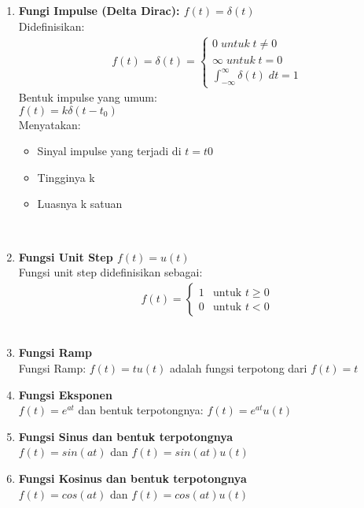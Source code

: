 \documentclass{article}
\begin{document}
\begin{enumerate}
    \item   \textbf{Fungi Impulse (Delta Dirac): $f(t) = \delta(t)$}\\
          Didefinisikan:
          \begin{align}
              f(t) = \delta (t) =
              \begin{cases}
                  0 \;untuk\; t \neq 0
                  \nonumber \\
                  \infty \;untuk\; t = 0
                  \nonumber \\
                  \int_{- \infty}^{\infty} \delta(t)\;dt=1
                  \nonumber
              \end{cases}
          \end{align}
          Bentuk impulse yang umum:\\
          $f(t) = k\delta(t-t_0)$ \\
          Menyatakan:
          \begin{itemize}
              \item Sinyal impulse yang terjadi di $t=t0$
              \item Tingginya k
              \item Luasnya k satuan
          \end{itemize}
          \leavevmode\\
    \item   \textbf{Fungsi Unit Step $f(t) = u(t)$}\\
          Fungsi unit step didefinisikan sebagai:
          \begin{align}
              f(t) =
              \begin{cases}
                  1 & \text{untuk $t \ge 0$}
                  \nonumber                  \\
                  0 & \text{untuk $t < 0$}
                  \nonumber
              \end{cases}
          \end{align}
          \leavevmode\\
    \item   \textbf{Fungsi Ramp}\\
          Fungsi Ramp: $f(t) = t u(t)$ adalah fungsi terpotong dari $f(t) = t$
          \leavevmode\\
    \item   \textbf{Fungsi Eksponen}\\
          $f(t) = e^{at}$ dan bentuk terpotongnya: $f(t) = e^{at} u(t)$
          \leavevmode\\
    \item   \textbf{Fungsi Sinus dan bentuk terpotongnya}\\
          $f(t) = sin(at)$ dan $f(t) = sin(at)u(t)$
          \leavevmode\\
    \item   \textbf{Fungsi Kosinus dan bentuk terpotongnya}\\
          $f(t) = cos(at)$ dan $f(t) = cos(at)u(t)$
          \leavevmode\\
\end{enumerate}
\leavevmode\\
\end{document}
